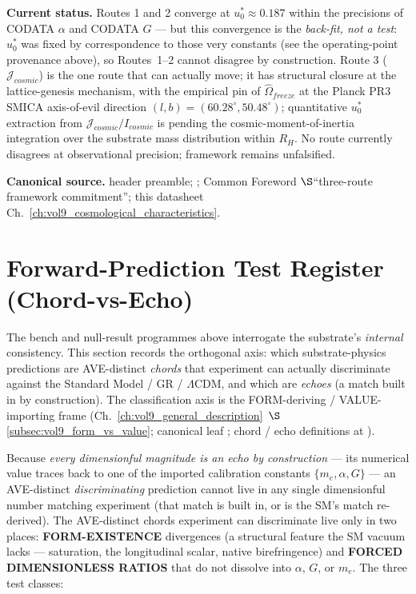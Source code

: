 \textbf{Current status.} Routes 1 and 2 converge at $u_0^* \approx 0.187$ within the precisions of CODATA $\alpha$ and CODATA $G$ --- but this convergence is the \emph{back-fit, not a test}: $u_0^*$ was fixed by correspondence to those very constants (see the operating-point provenance above), so Routes~1--2 cannot disagree by construction. Route 3 ($\mathcal{J}_{cosmic}$) is the one route that can actually move; it has structural closure at the lattice-genesis mechanism, with the empirical pin of $\hat{\Omega}_{freeze}$ at the Planck PR3 SMICA axis-of-evil direction $(l, b) = (60.28^\circ, 50.48^\circ)$; quantitative $u_0^*$ extraction from $\mathcal{J}_{cosmic}/I_{cosmic}$ is pending the cosmic-moment-of-inertia integration over the substrate mass distribution within $R_H$. No route currently disagrees at observational precision; framework remains unfalsified.

\textbf{Canonical source.}  header preamble; ; Common Foreword $\S$``three-route framework commitment''; this datasheet Ch.~\ref{ch:vol9_cosmological_characteristics}.

\section{Forward-Prediction Test Register (Chord-vs-Echo)}
\label{sec:vol9_forward_prediction_register}

The bench and null-result programmes above interrogate the substrate's \emph{internal} consistency. This section records the orthogonal axis: which substrate-physics predictions are AVE-distinct \emph{chords} that experiment can actually discriminate against the Standard Model / GR / $\Lambda$CDM, and which are \emph{echoes} (a match built in by construction). The classification axis is the FORM-deriving / VALUE-importing frame (Ch.~\ref{ch:vol9_general_description}~$\S$\ref{subsec:vol9_form_vs_value}; canonical leaf ; chord / echo definitions at ).

Because \emph{every dimensionful magnitude is an echo by construction} --- its numerical value traces back to one of the imported calibration constants $\{m_e, \alpha, G\}$ --- an AVE-distinct \emph{discriminating} prediction cannot live in any single dimensionful number matching experiment (that match is built in, or is the SM's match re-derived). The AVE-distinct chords experiment can discriminate live only in two places: \textbf{FORM-EXISTENCE} divergences (a structural feature the SM vacuum lacks --- saturation, the longitudinal scalar, native birefringence) and \textbf{FORCED DIMENSIONLESS RATIOS} that do not dissolve into $\alpha$, $G$, or $m_e$. The three test classes:

